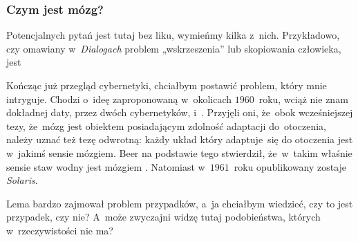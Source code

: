 \documentclass[10pt,t]{beamer}
\begin{document}
\begin{frame}
  \frametitle{Czym jest mózg?}


  Potencjalnych pytań jest tutaj bez liku, wymieńmy kilka z~nich.
  Przykładowo, czy omawiany w~\textit{Dialogach} problem „wskrzeszenia” lub
  skopiowania człowieka, jest

  Kończąc już przegląd cybernetyki, chciałbym postawić problem, który mnie
  intryguje. Chodzi o~ideę zaproponowaną w~okolicach $1960$~roku, wciąż nie
  znam dokładnej daty, przez dwóch cybernetyków,
  i~.
  Przyjęli oni, że~obok wcześniejszej tezy, że~mózg jest obiektem
  posiadającym zdolność adaptacji do~otoczenia, należy uznać też tezę
  odwrotną: każdy układ który adaptuje~się do otoczenia jest w~jakimś
  sensie mózgiem. Beer na podstawie tego stwierdził, że~w~takim właśnie
  sensie staw wodny jest mózgiem
  \parencite{Pickering-Cybernetics-in-Britain-Ver-2022}. Natomiast
  w~$1961$~roku opublikowany zostaje \textit{Solaris}.

  Lema bardzo zajmował problem przypadków, a~ja chciałbym wiedzieć, czy to
  jest przypadek, czy nie? A~może zwyczajni widzę tutaj podobieństwa,
  których w~rzeczywistości nie ma?

\end{frame}
\end{document}
